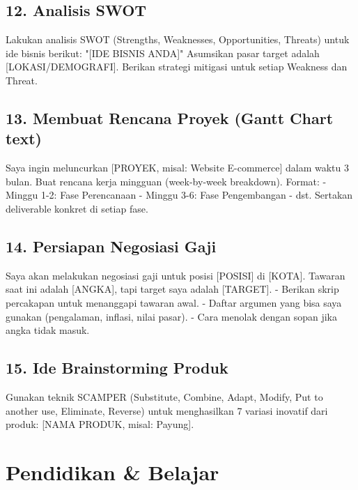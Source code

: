 \subsection{12. Analisis SWOT}
\begin{promptbox}
Lakukan analisis SWOT (Strengths, Weaknesses, Opportunities, Threats) untuk ide bisnis berikut:
"[IDE BISNIS ANDA]"
Asumsikan pasar target adalah [LOKASI/DEMOGRAFI]. Berikan strategi mitigasi untuk setiap Weakness dan Threat.
\end{promptbox}

\subsection{13. Membuat Rencana Proyek (Gantt Chart text)}
\begin{promptbox}
Saya ingin meluncurkan [PROYEK, misal: Website E-commerce] dalam waktu 3 bulan.
Buat rencana kerja mingguan (week-by-week breakdown).
Format:
- Minggu 1-2: Fase Perencanaan
- Minggu 3-6: Fase Pengembangan
- dst.
Sertakan deliverable konkret di setiap fase.
\end{promptbox}

\subsection{14. Persiapan Negosiasi Gaji}
\begin{promptbox}
Saya akan melakukan negosiasi gaji untuk posisi [POSISI] di [KOTA]. Tawaran saat ini adalah [ANGKA], tapi target saya adalah [TARGET].
- Berikan skrip percakapan untuk menanggapi tawaran awal.
- Daftar argumen yang bisa saya gunakan (pengalaman, inflasi, nilai pasar).
- Cara menolak dengan sopan jika angka tidak masuk.
\end{promptbox}

\subsection{15. Ide Brainstorming Produk}
\begin{promptbox}
Gunakan teknik SCAMPER (Substitute, Combine, Adapt, Modify, Put to another use, Eliminate, Reverse) untuk menghasilkan 7 variasi inovatif dari produk: [NAMA PRODUK, misal: Payung].
\end{promptbox}

\section{Pendidikan & Belajar}


